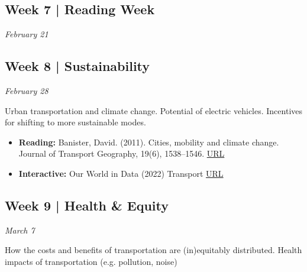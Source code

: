 \documentclass[11pt]{article}
\begin{document}
	
	
	
	
	\subsection*{Week 7 | Reading Week}
	
	\textit{February 21}
	
	
	
	\subsection*{Week 8 | Sustainability}
	
	\textit{February 28}
	
	Urban transportation and climate change. Potential of electric vehicles. Incentives for shifting to more sustainable modes.
	
	
	\begin{itemize}
		\item \textbf{Reading:} Banister, David. (2011). Cities, mobility and climate change. Journal of Transport
		Geography, 19(6), 1538–1546. \href{https://doi.org/10.1016/j.jtrangeo.2011.03.009}{URL}
		
		\item \textbf{Interactive:} Our World in Data (2022) Transport \href{https://ourworldindata.org/transport}{URL}
	\end{itemize}

	
	
	
	
	\subsection*{Week 9 | Health \& Equity}
	
	\textit{March 7}
	
	How the costs and benefits of transportation are (in)equitably distributed. Health impacts of transportation (e.g. pollution, noise)
	
\end{document}
